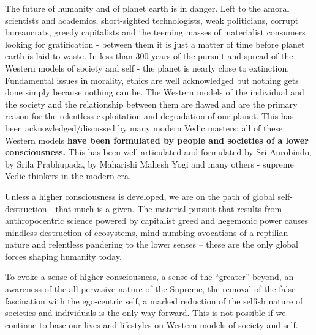 The future of humanity and of planet earth is in danger. Left to the amoral scientists and academics, short-sighted technologists, weak politicians, corrupt bureaucrats, greedy capitalists and the teeming masses of materialist consumers looking for gratification - between them it is just a matter of time before planet earth is laid to waste. In less than 300 years of the pursuit and spread of the Western models of society and self - the planet is nearly close to extinction. Fundamental issues in morality, ethics are well acknowledged but nothing gets done simply because nothing can be. The Western models of the individual and the society and the relationship between them are flawed and are the primary reason for the relentless exploitation and degradation of our planet. This has been acknowledged/discussed by many modern Vedic masters; all of these Western models \textbf{have been formulated by people and societies of a lower consciousness.} This has been well articulated and formulated by Sri Aurobindo, by Srila Prabhupada, by Maharishi Mahesh Yogi and many others - supreme Vedic thinkers in the modern era.

Unless a higher consciousness is developed, we are on the path of global self-destruction - that much is a given. The material pursuit that results from anthropocentric science powered by capitalist greed and hegemonic power causes mindless destruction of ecosystems, mind-numbing avocations of a reptilian nature and relentless pandering to the lower senses – these are the only global forces shaping humanity today.

To evoke a sense of higher consciousness, a sense of the “greater” beyond, an awareness of the all-pervasive nature of the Supreme, the removal of the false fascination with the ego-centric self, a marked reduction of the selfish nature of societies and individuals is the only way forward. This is not possible if we continue to base our lives and lifestyles on Western models of society and self.

